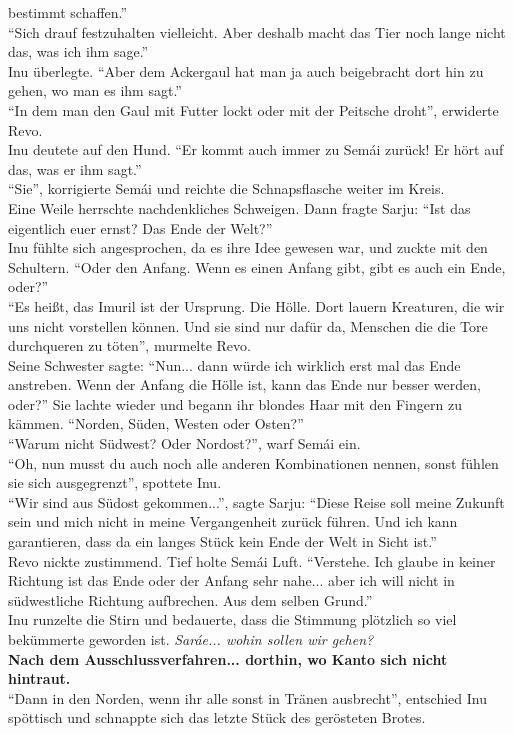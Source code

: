bestimmt schaffen.''\\
``Sich drauf festzuhalten vielleicht. Aber deshalb macht das Tier noch lange nicht das, was ich ihm 
sage.''\\
Inu überlegte. ``Aber dem Ackergaul hat man ja auch beigebracht dort hin zu gehen, wo man es ihm 
sagt.''\\
``In dem man den Gaul mit Futter lockt oder mit der Peitsche droht'', erwiderte Revo.\\
Inu deutete auf den Hund. ``Er kommt auch immer zu Semái zurück! Er hört auf das, was er ihm 
sagt.''\\
``Sie'', korrigierte Semái und reichte die Schnapsflasche weiter im Kreis.\\
Eine Weile herrschte nachdenkliches Schweigen. Dann fragte Sarju: ``Ist das eigentlich euer 
ernst? Das Ende der Welt?''\\
Inu fühlte sich angesprochen, da es ihre Idee gewesen war, und zuckte mit den Schultern. ``Oder den 
Anfang. Wenn es einen Anfang gibt, gibt es auch ein Ende, oder?''\\
``Es heißt, das Imuril ist der Ursprung. Die Hölle. Dort lauern Kreaturen, die wir uns nicht 
vorstellen können. Und sie sind nur dafür da, Menschen die die Tore durchqueren zu töten'', 
murmelte Revo.\\
Seine Schwester sagte: ``Nun... dann würde ich wirklich erst mal das Ende anstreben. Wenn der 
Anfang die Hölle ist, kann das Ende nur besser werden, oder?'' Sie lachte wieder und begann ihr 
blondes Haar mit den Fingern zu kämmen. ``Norden, Süden, Westen oder Osten?''\\
``Warum nicht Südwest? Oder Nordost?'', warf Semái ein.\\
``Oh, nun musst du auch noch alle anderen Kombinationen nennen, sonst fühlen sie sich 
ausgegrenzt'', spottete Inu.\\
``Wir sind aus Südost gekommen...'', sagte Sarju: ``Diese Reise soll meine Zukunft sein und mich 
nicht in meine Vergangenheit zurück führen. Und ich kann garantieren, dass da ein langes Stück kein 
Ende der Welt in Sicht ist.''\\
Revo nickte zustimmend. Tief holte Semái Luft. ``Verstehe. Ich glaube in keiner Richtung ist das 
Ende oder der Anfang sehr nahe... aber ich will nicht in südwestliche Richtung aufbrechen. Aus dem 
selben Grund.''\\
Inu runzelte die Stirn und bedauerte, dass die Stimmung plötzlich so viel bekümmerte geworden ist. 
\textit{Saráe... wohin sollen wir gehen?}\\
\textbf{Nach dem Ausschlussverfahren... dorthin, wo Kanto sich nicht hintraut.}\\
``Dann in den Norden, wenn ihr alle sonst in Tränen ausbrecht'', entschied Inu spöttisch und 
schnappte sich das letzte Stück des gerösteten Brotes. \\





